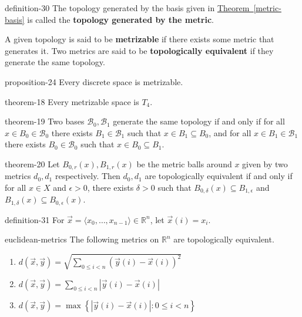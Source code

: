 \documentclass[10pt,]{article}
\newcommand{\terminology}[1]{\textbf{#1}}
\newcommand{\tuple}[1]{\langle #1 \rangle}
\newcommand{\mb}{\mathbb}
\newcommand{\mc}{\mathcal}
\newcommand{\setBuilder}[2]{\left\{#1:#2\right\}}
\newcommand{\lt}{<}
\newcommand{\gt}{>}
\begin{document}
\begin{definition}{}{definition-30}%
\hypertarget{p-107}{}%
The topology generated by the basis given in \hyperref[metric-basis]{Theorem~\ref{metric-basis}} is called the \terminology{topology generated by the metric}.%
\par
\hypertarget{p-108}{}%
A given topology is said to be \terminology{metrizable} if there exists some metric that generates it. Two metrics are said to be \terminology{topologically equivalent} if they generate the same topology.%
\end{definition}
\begin{proposition}{}{}{proposition-24}%
\hypertarget{p-109}{}%
Every discrete space is metrizable.%
\end{proposition}
\begin{theorem}{}{}{theorem-18}%
\hypertarget{p-110}{}%
Every metrizable space is \(T_4\).%
\end{theorem}
\begin{theorem}{}{}{theorem-19}%
\hypertarget{p-111}{}%
Two bases \(\mc B_0,\mc B_1\) generate the same topology if and only if for all \(x\in B_0\in\mc B_0\) there exists \(B_1\in\mc B_1\) such that \(x\in B_1\subseteq B_0\), and for all \(x\in B_1\in\mc B_1\) there exists \(B_0\in\mc B_0\) such that \(x\in B_0\subseteq B_1\). %
\end{theorem}
\begin{theorem}{}{}{theorem-20}%
\hypertarget{p-112}{}%
Let \(B_{0,r}(x),B_{1,r}(x)\) be the metric balls around \(x\) given by two metrics \(d_0,d_1\) respectively. Then \(d_0,d_1\) are topologically equivalent if and only if for all \(x\in X\) and \(\epsilon\gt 0\), there exists \(\delta\gt 0\) such that \(B_{0,\delta}(x)\subseteq B_{1,\epsilon}\) and \(B_{1,\delta}(x)\subseteq B_{0,\epsilon}(x)\).%
\end{theorem}
\begin{definition}{}{definition-31}%
\hypertarget{p-113}{}%
For \(\vec x=\tuple{x_0,\dots,x_{n-1}}\in\mb R^n\), let \(\vec x(i)=x_i\).%
\end{definition}
\begin{theorem}{}{}{euclidean-metrics}%
\hypertarget{p-114}{}%
The following metrics on \(\mb R^n\) are topologically equivalent.%
\leavevmode%
\begin{enumerate}
\item\hypertarget{li-101}{}\(d(\vec x,\vec y)=\sqrt{\sum_{0\leq i\lt n}(\vec y(i)-\vec x(i))^2}\)%
\item\hypertarget{li-102}{}\(d(\vec x,\vec y)=\sum_{0\leq i\lt n}|\vec y(i)-\vec x(i)|\)%
\item\hypertarget{li-103}{}\(d(\vec x,\vec y)=\max\setBuilder{|\vec y(i)-\vec x(i)|}{0\leq i\lt n}\)%
\end{enumerate}
\end{theorem}
\end{document}
